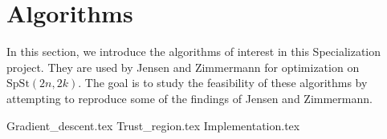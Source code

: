 \section{Algorithms}
In this section, we introduce the algorithms of interest in this Specialization project. They are used by Jensen and Zimmermann for optimization on $\mathrm{SpSt}(2n, 2k)$. The goal is to study the feasibility of these algorithms by attempting to reproduce some of the findings of Jensen and Zimmermann. 

{Gradient_descent.tex}
{Trust_region.tex}
{Implementation.tex}